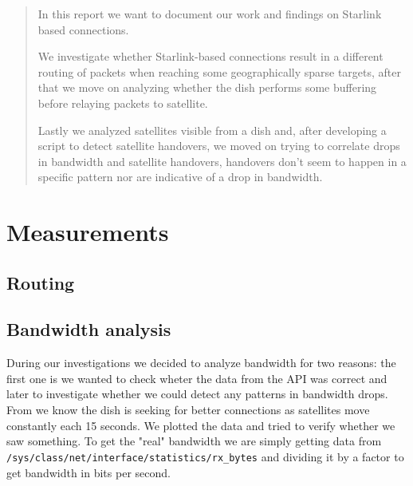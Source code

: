 \documentclass[IN,11pt,twoside,openright,bachelor,english]{tumthesis}
\author{Roberto Castellotti}
\date{September 15, 2016}
\begin{document}
%


\maketitle%
\cleardoublepage


\begin{abstract} 
In this report we want to document our work and findings on Starlink based connections. 

We investigate whether Starlink-based connections result in a different routing of packets when reaching some geographically sparse targets, after that we move on analyzing whether the dish performs some buffering before relaying packets to satellite.

Lastly we analyzed satellites visible from a dish and, after developing a script to detect satellite handovers, we moved on trying to correlate  drops in bandwidth and satellite handovers, handovers don't seem to happen in a specific pattern nor are indicative of a drop in bandwidth. 
\end{abstract}


\begin{thanks}
\end{thanks}

\tableofcontents
\listoffigures
\listoftables

\startcontent


\chapter{Measurements}

\section{Routing}

\section{Bandwidth analysis}
During our investigations we decided to analyze bandwidth for two reasons: the first one is we wanted to check wheter the data from the API was correct and later to investigate whether we could detect any patterns in bandwidth drops. From \cite{llc-application} we know the dish is seeking for better connections as satellites move constantly each 15 seconds. We plotted the data and tried to verify whether we saw something.
To get the "real" bandwidth we are simply getting data from \texttt{/sys/class/net/{interface}/statistics/rx\_bytes} and dividing it by a factor to get bandwidth in bits per second.
\end{document}
